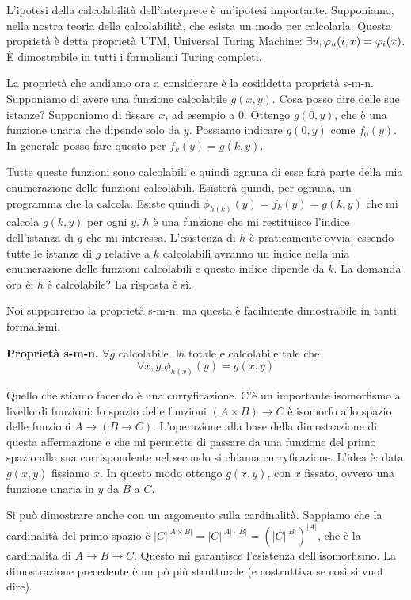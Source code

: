 L'ipotesi della calcolabilità dell'interprete è un'ipotesi importante. Supponiamo, nella nostra
teoria della calcolabilità, che esista un modo per calcolarla. Questa proprietà è detta proprietà
UTM, Universal Turing Machine: $\exists u, \varphi_{u}(i,x) = \varphi_{i}(x)$. È dimostrabile in tutti i
formalismi Turing completi.

La proprietà che andiamo ora a considerare è la cosiddetta proprietà s-m-n. Supponiamo di avere
una funzione calcolabile $g(x,y)$. Cosa posso dire delle sue istanze? Supponiamo di fissare $x$, ad
esempio a $0$. Ottengo $g(0,y)$, che è una funzione unaria che dipende solo da $y$. Possiamo indicare
$g(0,y)$ come $f_{0}(y)$. In generale posso fare questo per $f_{k}(y) = g(k,y)$.

Tutte queste funzioni sono calcolabili e quindi ognuna di esse farà parte della mia enumerazione
delle funzioni calcolabili. Esisterà quindi, per ognuna, un programma che la calcola. Esiste quindi
$\phi_{h(k)}(y) = f_{k}(y) = g(k,y)$ che mi calcola $g(k,y)$ per ogni $y$. $h$ è una funzione che
mi restituisce l'indice dell'istanza di $g$ che mi interessa. L'esistenza di $h$ è praticamente
ovvia: essendo tutte le istanze di $g$ relative a $k$ calcolabili avranno un indice nella mia
enumerazione delle funzioni calcolabili e questo indice dipende da $k$. La domanda ora è: $h$ è
calcolabile? La risposta è sì.

Noi supporremo la proprietà s-m-n, ma questa è facilmente dimostrabile in tanti formalismi.
\begin{thm}
    \textbf{Proprietà s-m-n. } $\forall g$ calcolabile $\exists h$ totale e calcolabile tale che
    \begin{equation*}
        \forall x,y. \phi_{h(x)}(y) = g(x,y)
    \end{equation*}
\end{thm}

Quello che stiamo facendo è una curryficazione. C'è un importante isomorfismo a livello di funzioni:
lo spazio delle funzioni $(A \times B) \to C$ è isomorfo allo spazio delle funzioni $A \to (B \to
C)$. L'operazione alla base della dimostrazione di questa affermazione e che mi permette di passare
da una funzione del primo spazio alla sua corrispondente nel secondo si chiama curryficazione.
L'idea è: data $g(x,y)$ fissiamo $x$. In questo modo ottengo $g(x,y)$, con $x$ fissato, ovvero una funzione
unaria in $y$ da $B$ a $C$.

Si può dimostrare anche con un argomento sulla cardinalità. Sappiamo che la cardinalità del primo
spazio è $|C|^{|A \times B|} = |C|^{|A|\cdot|B|} = (|C|^{|B|})^{|A|}$, che è la cardinalita di $A
\to B \to C$. Questo mi garantisce l'esistenza dell'isomorfismo. La dimostrazione precedente è un pò
più strutturale (e costruttiva se così si vuol dire).

